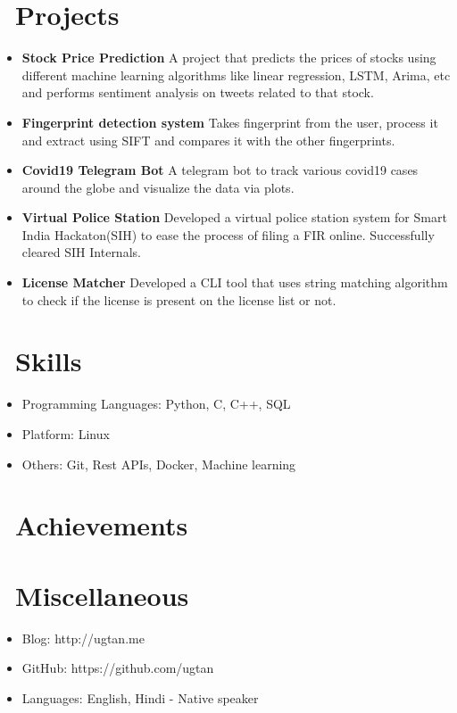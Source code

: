 \documentclass{resume}
\begin{document}
\section{\faProjectDiagram\ Projects}
\begin{itemize}
  \item \textbf{Stock Price Prediction} A project that predicts the prices of stocks using different machine learning algorithms like linear regression, LSTM, Arima, etc and performs sentiment analysis on tweets related to that stock.
  \item \textbf{Fingerprint detection system} Takes fingerprint from the user, process it and extract using SIFT and compares it with the other fingerprints.
  \item \textbf{Covid19 Telegram Bot} A telegram bot to track various covid19 cases around the globe and visualize the data via plots.
  \item \textbf{Virtual Police Station} Developed a virtual police station system for Smart India Hackaton(SIH) to ease the process of filing a FIR online. Successfully cleared SIH Internals.
  \item \textbf{License Matcher} Developed a CLI tool that uses string matching algorithm to check if the license is present on the license list or not.
\end{itemize}


\section{\faCogs\ Skills}
\begin{itemize}[parsep=0.5ex]
  \item Programming Languages: Python, C, C++, SQL
  \item Platform: Linux
  \item Others: Git, Rest APIs, Docker, Machine learning
\end{itemize}

\section{\faHeartO\ Achievements}

\section{\faInfo\ Miscellaneous}
\begin{itemize}[parsep=0.5ex]
  \item Blog: http://ugtan.me
  \item GitHub: https://github.com/ugtan
  \item Languages: English, Hindi - Native speaker
\end{itemize}

%
%
\end{document}
